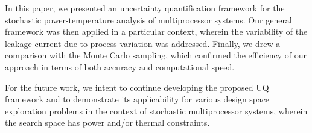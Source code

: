 In this paper, we presented an uncertainty quantification framework for the stochastic power-temperature analysis of multiprocessor systems. Our general framework was then applied in a particular context, wherein the variability of the leakage current due to process variation was addressed. Finally, we drew a comparison with the Monte Carlo sampling, which confirmed the efficiency of our approach in terms of both accuracy and computational speed.

For the future work, we intent to continue developing the proposed UQ framework and to demonstrate its applicability for various design space exploration problems in the context of stochastic multiprocessor systems, wherein the search space has power and/or thermal constraints.
